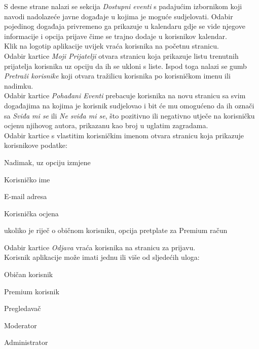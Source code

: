 		\indent S desne strane nalazi se sekcija \textit{Dostupni eventi} s padajućim izbornikom koji navodi nadolazeće javne događaje u kojima je moguće sudjelovati. Odabir pojedinog događaja privremeno ga prikazuje u kalendaru gdje se vide njegove informacije i opcija prijave čime se trajno dodaje u korisnikov kalendar. \\
		
		\indent Klik na logotip aplikacije uvijek vraća korisnika na početnu stranicu. \\
		
		\indent Odabir kartice \textit{Moji Prijatelji} otvara stranicu koja prikazuje listu trenutnih prijatelja korisnika uz opciju da ih se ukloni s liste. Ispod toga nalazi se gumb \textit{Pretraži korisnike} koji otvara tražilicu korisnika po korisničkom imenu ili nadimku. \\
		
		\indent Odabir kartice \textit{Pohađani Eventi} prebacuje korisnika na novu stranicu sa svim događajima na kojima je korisnik sudjelovao i bit će mu omogućeno da ih označi sa \textit{Sviđa mi se} ili \textit{Ne sviđa mi se}, što pozitivno ili negativno utječe na korisničku ocjenu njihovog autora, prikazanu kao broj u uglatim zagradama. \\
		
		\indent Odabir kartice s vlastitim korisničkim imenom otvara stranicu koja prikazuje korisnikove podatke:
		
		\begin{packed_item}
			\item Nadimak, uz opciju izmjene
			\item Korisničko ime
			\item E-mail adresa
			\item Korisnička ocjena
			\item ukoliko je riječ o običnom korisniku, opcija pretplate za Premium račun
		\end{packed_item}
		
		\indent Odabir kartice \textit{Odjava} vraća korisnika na stranicu za prijavu. \\
		
		\indent Korisnik aplikacije može imati jednu ili više od sljedećih uloga:
		
		\begin{packed_item}
			\item Običan korisnik
			\item Premium korisnik
			\item Pregledavač
			\item Moderator
			\item Administrator
		\end{packed_item}
	
